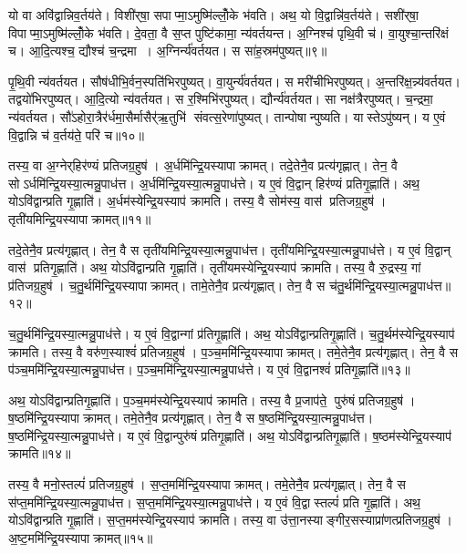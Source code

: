 यो वा अवि॑द्वान्निव॒र्तय॑ते।
विशी॑र्‌षा॒ सपाप्मा॒ऽमुष्मि॑ल्लोँ॒के भ॑वति।
अथ॒ यो वि॒द्वान्नि॑व॒र्तय॑ते।
सशी॑र्‌षा॒ विपाप्मा॒ऽमुष्मि॑ल्लोँ॒के भ॑वति।
दे॒वता॒ वै स॒प्त पुष्टि॑कामा॒ न्य॑वर्तयन्त।
अ॒ग्निश्च॑ पृथि॒वी च॑।
वा॒युश्चा॒न्तरि॑क्षं च।
आ॒दि॒त्यश्च॒ द्यौश्च॑ च॒न्द्रमा।
अ॒ग्निर्न्य॑वर्तयत।
स सा॑ह॒स्रम॑पुष्यत्॥९॥

पृ॒थि॒वी न्य॑वर्तयत।
सौष॑धीभि॒र्वन॒स्पति॑भिरपुष्यत्।
वा॒युर्न्य॑वर्तयत।
स मरी॑चीभिरपुष्यत्।
अ॒न्तरि॑क्ष॒न्न्य॑वर्तयत।
तद्वयो॑भिरपुष्यत्।
आ॒दि॒त्यो न्य॑वर्तयत।
स र॒श्मिभि॑रपुष्यत्।
द्यौर्न्य॑वर्तयत।
सा नक्ष॑त्रैरपुष्यत्।
च॒न्द्रमा॒ न्य॑वर्तयत।
सौ॑ऽहोरा॒त्रैर॑र्धमा॒सैर्मासैर्॑ऋ॒तुभि॑ संवत्स॒रेणा॑पुष्यत्।
तान्पोषान्पुष्यति।
यास्तेऽपु॑ष्यन्।
य ए॒वं वि॒द्वान्नि च॑ व॒र्तय॑ते॒ परि॑ च॥१०॥\anuvakamend[अ॒पु॒ष्य॒न्नक्ष॑त्रैरपुष्य॒त्पञ्च॑ च]

तस्य॒ वा अ॒ग्नेर्‌हिर॑ण्यं प्रतिजग्र॒हुष॑।
अ॒र्धमि॑न्द्रि॒यस्यापाक्रामत्।
तदे॒तेनै॒व प्रत्य॑गृह्णात्।
तेन॒ वै सोऽर्धमि॑न्द्रि॒यस्या॒त्मन्नु॒पाध॑त्त।
अ॒र्धमि॑न्द्रि॒यस्या॒त्मन्नु॒पाध॑त्ते।
य ए॒वं वि॒द्वान् हिर॑ण्यं प्रतिगृ॒ह्णाति॑।
अथ॒ योऽवि॑द्वान्प्रति गृ॒ह्णाति॑।
अ॒र्धम॑स्येन्द्रि॒यस्याप॑ क्रामति।
तस्य॒ वै सोम॑स्य॒ वास॑ प्रतिजग्र॒हुष॑।
तृती॑यमिन्द्रि॒यस्यापाक्रामत्॥११॥

तदे॒तेनै॒व प्रत्य॑गृह्णात्।
तेन॒ वै स तृती॑यमिन्द्रि॒यस्या॒त्मन्नु॒पाध॑त्त।
तृती॑यमिन्द्रि॒यस्या॒त्मन्नु॒पाध॑त्ते।
य ए॒वं वि॒द्वान् वास॑ प्रतिगृ॒ह्णाति॑।
अथ॒ योऽवि॑द्वान्प्रति गृ॒ह्णाति॑।
तृती॑यमस्येन्द्रि॒यस्याप॑ क्रामति।
तस्य॒ वै रु॒द्रस्य॒ गां प्र॑तिजग्र॒हुष॑।
च॒तु॒र्थमि॑न्द्रि॒यस्यापाक्रामत्।
तामे॒तेनै॒व प्रत्य॑गृह्णात्।
तेन॒ वै स च॑तु॒र्थमि॑न्द्रि॒यस्या॒त्मन्नु॒पाध॑त्त॥१२॥

च॒तु॒र्थमि॑न्द्रि॒यस्या॒त्मन्नु॒पाध॑त्ते।
य ए॒वं वि॒द्वान्गां प्र॑तिगृ॒ह्णाति॑।
अथ॒ योऽवि॑द्वान्प्रतिगृ॒ह्णाति॑।
च॒तु॒र्थम॑स्येन्द्रि॒यस्याप॑ क्रामति।
तस्य॒ वै वरु॑ण॒स्याश्वं॑ प्रतिजग्र॒हुष॑।
प॒ञ्च॒ममि॑न्द्रि॒यस्यापाक्रामत्।
तमे॒तेनै॒व प्रत्य॑गृह्णात्।
तेन॒ वै स प॑ञ्च॒ममि॑न्द्रि॒यस्या॒त्मन्नु॒पाध॑त्त।
प॒ञ्च॒ममि॑न्द्रि॒यस्या॒त्मन्नु॒पाध॑त्ते।
य ए॒वं वि॒द्वानश्वं॑ प्रतिगृ॒ह्णाति॑॥१३॥

अथ॒ योऽवि॑द्वान्प्रतिगृ॒ह्णाति॑।
प॒ञ्च॒मम॑स्येन्द्रि॒यस्याप॑ क्रामति।
तस्य॒ वै प्र॒जाप॑ते॒ पुरु॑षं प्रतिजग्र॒हुष॑।
ष॒ष्ठमि॑न्द्रि॒यस्यापाक्रामत्।
तमे॒तेनै॒व प्रत्य॑गृह्णात्।
तेन॒ वै स ष॒ष्ठमि॑न्द्रि॒यस्या॒त्मन्नु॒पाध॑त्त।
ष॒ष्ठमि॑न्द्रि॒यस्या॒त्मन्नु॒पाध॑त्ते।
य ए॒वं वि॒द्वान्पुरु॑षं प्रतिगृ॒ह्णाति॑।
अथ॒ योऽवि॑द्वान्प्रतिगृ॒ह्णाति॑।
ष॒ष्ठम॑स्येन्द्रि॒यस्याप॑ क्रामति॥१४॥

तस्य॒ वै मनो॒स्तल्पं॑ प्रतिजग्र॒हुष॑।
स॒प्त॒ममि॑न्द्रि॒यस्यापाक्रामत्।
तमे॒तेनै॒व प्रत्य॑गृह्णात्।
तेन॒ वै स स॑प्त॒ममि॑न्द्रि॒यस्या॒त्मन्नु॒पाध॑त्त।
स॒प्त॒ममि॑न्द्रि॒यस्या॒त्मन्नु॒पाध॑त्ते।
य ए॒वं वि॒द्वास्तल्पं॑ प्रति गृ॒ह्णाति॑।
अथ॒ योऽवि॑द्वान्प्रति गृ॒ह्णाति॑।
स॒प्त॒मम॑स्येन्द्रि॒यस्याप॑ क्रामति।
तस्य॒ वा उ॑त्ता॒नस्याङ्गीर॒सस्याप्रा॑णत्प्रतिजग्र॒हुष॑।
अ॒ष्ट॒ममि॑न्द्रि॒यस्यापाक्रामत्॥१५॥


